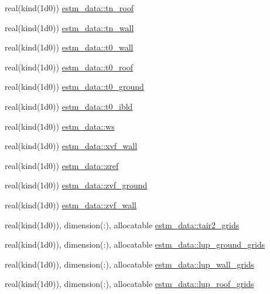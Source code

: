 \begin{DoxyCompactItemize}
\item 
real(kind(1d0)) \hyperlink{namespaceestm__data_a50154a0f89e449784f754f7109a400a6}{estm\+\_\+data\+::tn\+\_\+roof}
\item 
real(kind(1d0)) \hyperlink{namespaceestm__data_a5a5ae17df9fbcfc4b4d7ce3510cff799}{estm\+\_\+data\+::tn\+\_\+wall}
\item 
real(kind(1d0)) \hyperlink{namespaceestm__data_aed2c55922d93ab016a0c88a5786c16c5}{estm\+\_\+data\+::t0\+\_\+wall}
\item 
real(kind(1d0)) \hyperlink{namespaceestm__data_a4d8c08047c27c858357a35947aa2cc8d}{estm\+\_\+data\+::t0\+\_\+roof}
\item 
real(kind(1d0)) \hyperlink{namespaceestm__data_a2dbe0d9dc5c526a806a724c6b200a172}{estm\+\_\+data\+::t0\+\_\+ground}
\item 
real(kind(1d0)) \hyperlink{namespaceestm__data_a37971a0ee2a83ac906b6ae92bfc91f7d}{estm\+\_\+data\+::t0\+\_\+ibld}
\item 
real(kind(1d0)) \hyperlink{namespaceestm__data_afbfac6ece52d6f190b854a3d3dd59631}{estm\+\_\+data\+::ws}
\item 
real(kind(1d0)) \hyperlink{namespaceestm__data_aea93574cedba3c739a606830f554c1c8}{estm\+\_\+data\+::xvf\+\_\+wall}
\item 
real(kind(1d0)) \hyperlink{namespaceestm__data_a7a588a40e148a295f285c787a02ade42}{estm\+\_\+data\+::zref}
\item 
real(kind(1d0)) \hyperlink{namespaceestm__data_a365fa91a213f8ebc878031e257ce4fd8}{estm\+\_\+data\+::zvf\+\_\+ground}
\item 
real(kind(1d0)) \hyperlink{namespaceestm__data_a6b3a0a92c8d41c4040f316204cd7a6ec}{estm\+\_\+data\+::zvf\+\_\+wall}
\item 
real(kind(1d0)), dimension(\+:), allocatable \hyperlink{namespaceestm__data_a748eeedc041c2a83b7242c1d000c349d}{estm\+\_\+data\+::tair2\+\_\+grids}
\item 
real(kind(1d0)), dimension(\+:), allocatable \hyperlink{namespaceestm__data_a977124a50a548296f4426725f2a326e2}{estm\+\_\+data\+::lup\+\_\+ground\+\_\+grids}
\item 
real(kind(1d0)), dimension(\+:), allocatable \hyperlink{namespaceestm__data_aad6c08dce02c049effc5aea3125cd83b}{estm\+\_\+data\+::lup\+\_\+wall\+\_\+grids}
\item 
real(kind(1d0)), dimension(\+:), allocatable \hyperlink{namespaceestm__data_a0086dd575cf8c39c41112cd3ce9ac5eb}{estm\+\_\+data\+::lup\+\_\+roof\+\_\+grids}
\item 

\end{DoxyCompactItemize}
